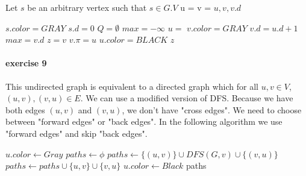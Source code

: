 \documentclass{book}
\begin{document}
	\begin{algorithm}[h!]
		\begin{algorithmic}[1]
			\State Let $s$ be an arbitrary vertex such that  $s \in G.V$
			\State {}
			\State u = 
			\State {}
			\State v = 
			\State \Return $u, v, v.d$
			\EndFunction
		\end{algorithmic}
	\end{algorithm}
	\begin{algorithm}[h!]		
		\begin{algorithmic}[1]
				\State $s.color = GRAY$
				\State $s.d = 0$
				\State $Q = \emptyset$
				\State {}
				\State $max = -\infty$
					\State $u = $ 
							\State $v.color = GRAY$
							\State $v.d = u.d + 1$
								\State $max = v.d$
								\State $z = v$
							\EndIf
							\State $v.\pi = u$
							\State {}
						\EndIf
					\EndFor
					\State $u.color = BLACK$
					\EndWhile
					\State \Return $z$
			\EndFunction																				
		\end{algorithmic}	
	\end{algorithm}
	\FloatBarrier	
	\paragraph{exercise 9}
	This undirected graph is equivalent to a directed graph which for all $u, v \in V$, $(u, v), (v, u) \in E$. We can use a modified version of DFS. Because we have both edges $(u, v)$ and $(v, u)$, we don't have "cross edges". We need to choose between "forward edges" or "back edges". In the following algorithm we use "forward edges" and skip "back edges".
	\begin{algorithm*}
		\begin{algorithmic}[1]
				\State $u.color \gets Gray$
				\State $paths \gets \phi$
					 
						\State $paths \gets \{(u, v)\} \cup DFS(G, v) \cup \{(v, u)\}$
					 
						\State $paths \gets paths \cup \{u, v\} \cup \{v, u\}$
					\EndIf
				\EndFor
				\State $u.color \gets Black$
				\State \Return paths
			\EndFunction
		\end{algorithmic}
	\end{algorithm*}
	\FloatBarrier
\end{document}
